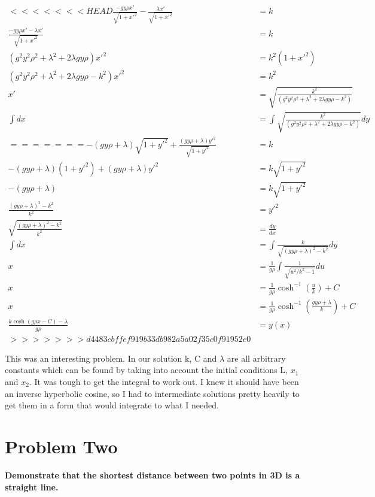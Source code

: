 \documentclass[10pt]{article} %
\begin{document}
\begin{align*}
<<<<<<< HEAD
  \frac{-gy\rho x'}{\sqrt{1 + x'^2}} - \frac{\lambda x'}{\sqrt{1+x'^2}} &= k\\
  \frac{-gy\rho x' - \lambda x'}{\sqrt{1 + x'^2}} &= k\\
  \left(g^2y^2\rho^2 + \lambda^2 + 2\lambda gy\rho\right)x'^2 &= k^2\left(1 + x'^2\right)\\
  \left(g^2y^2\rho^2 + \lambda^2 + 2\lambda gy\rho -k^2\right)x'^2 &= k^2\\
  x' &= \sqrt{\frac{k^2}{\left(g^2y^2\rho^2 + \lambda^2 + 2\lambda gy\rho -k^2\right)}}\\
  \int dx &= \int \sqrt{\frac{k^2}{\left(g^2y^2\rho^2 + \lambda^2 + 2\lambda gy\rho -k^2\right)}}dy\\
=======
  -\left(gy\rho + \lambda\right)\sqrt{1 + y'^2} + \frac{\left(gy\rho + \lambda\right)y'^2}{\sqrt{1 + y'^2}} &= k\\
  -\left(gy\rho + \lambda\right)\left(1 + y'^2\right) + \left(gy\rho + \lambda\right)y'^2 &= k\sqrt{1 + y'^2}\\
  -\left(gy\rho + \lambda\right) &= k\sqrt{1 + y'^2}\\
  \frac{\left(gy\rho + \lambda\right)^2 - k^2}{k^2} &= y'^2\\
  \sqrt{\frac{\left(gy\rho + \lambda\right)^2 - k^2}{k^2}} &= \frac{dy}{dx}\\
  \int dx &= \int \frac{k}{\sqrt{\left(gy\rho + \lambda\right)^2 - k^2}}dy\\
  x &= \frac{1}{g\rho}\int \frac{1}{\sqrt{u^2/k^2 - 1}}du\\
  x &= \frac{1}{g\rho}\cosh^{-1}\left(\frac{u}{k}\right) + C\\
  x &= \frac{1}{g\rho}\cosh^{-1}\left(\frac{gy\rho + \lambda}{k}\right) + C\\
  \frac{k\cosh(g\rho x - C) - \lambda}{g\rho} &= y(x)\\
>>>>>>> d4483cbffef919b33db982a5a02f35c0f91952e0
\end{align*}

This was an interesting problem. In our solution k, C and $\lambda$ are all arbitrary constants which can be found by taking into account the initial conditions L, $x_1$ and $x_2$. It was tough to get the integral to work out. I knew it should have been an inverse hyperbolic cosine, so I had to intermediate solutions pretty heavily to get them in a form that would integrate to what I needed.\\

\section{Problem Two}
\textbf{Demonstrate that the shortest distance between two points in 3D is a straight line.}
\end{document}
